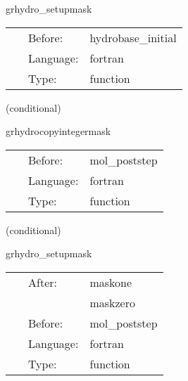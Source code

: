 \documentclass{article}
\begin{document}
\hspace{5mm} grhydro\_setupmask 

\hspace{5mm}{\it initialize the atmosphere mask } 


\hspace{5mm}

 \begin{tabular*}{160mm}{cll} 
~ & Before:  & hydrobase\_initial \\ 
~ & Language:  & fortran \\ 
~ & Type:  & function \\ 
\end{tabular*} 


\vspace{5mm}

   (conditional) 

\hspace{5mm} grhydrocopyintegermask 

\hspace{5mm}{\it initialize the real valued atmosphere mask after checkpoint recovery } 


\hspace{5mm}

 \begin{tabular*}{160mm}{cll} 
~ & Before:  & mol\_poststep \\ 
~ & Language:  & fortran \\ 
~ & Type:  & function \\ 
\end{tabular*} 


\vspace{5mm}

   (conditional) 

\hspace{5mm} grhydro\_setupmask 

\hspace{5mm}{\it initialize the atmosphere mask } 


\hspace{5mm}

 \begin{tabular*}{160mm}{cll} 
~ & After:  & maskone \\ 
~& ~ &maskzero\\ 
~ & Before:  & mol\_poststep \\ 
~ & Language:  & fortran \\ 
~ & Type:  & function \\ 
\end{tabular*} 
\end{document}
